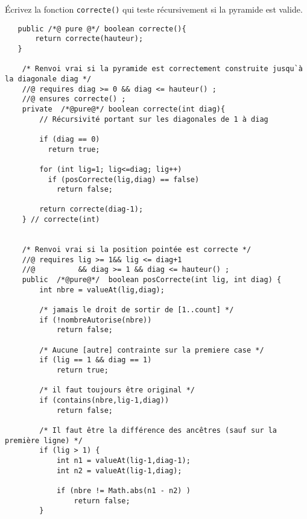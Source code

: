 \documentclass[10pt]{article}\usepackage[correction,nu]{esial}
\begin{document}
\begin{Question}
  Écrivez la fonction \texttt{correcte()} qui teste récursivement si la
  pyramide est valide.
\end{Question}
\begin{Reponse}
  \noindent{}

  \noindent{}

	
\begin{verbatim}
   public /*@ pure @*/ boolean correcte(){
       return correcte(hauteur);
   } 

    /* Renvoi vrai si la pyramide est correctement construite jusqu`à la diagonale diag */
    //@ requires diag >= 0 && diag <= hauteur() ;
    //@ ensures correcte() ;
    private  /*@pure@*/ boolean correcte(int diag){
        // Récursivité portant sur les diagonales de 1 à diag

        if (diag == 0)
          return true;

        for (int lig=1; lig<=diag; lig++)
          if (posCorrecte(lig,diag) == false)
            return false;

        return correcte(diag-1);
    } // correcte(int)


    /* Renvoi vrai si la position pointée est correcte */
    //@ requires lig >= 1&& lig <= diag+1 
    //@          && diag >= 1 && diag <= hauteur() ;
    public  /*@pure@*/  boolean posCorrecte(int lig, int diag) {
        int nbre = valueAt(lig,diag);

        /* jamais le droit de sortir de [1..count] */
        if (!nombreAutorise(nbre)) 
            return false;

        /* Aucune [autre] contrainte sur la premiere case */
        if (lig == 1 && diag == 1)
            return true;

        /* il faut toujours être original */
        if (contains(nbre,lig-1,diag)) 
            return false;

        /* Il faut être la différence des ancêtres (sauf sur la première ligne) */
        if (lig > 1) {
            int n1 = valueAt(lig-1,diag-1);
            int n2 = valueAt(lig-1,diag);

            if (nbre != Math.abs(n1 - n2) )
                return false;
        }


\end{verbatim}
\end{Reponse}
\end{document}
